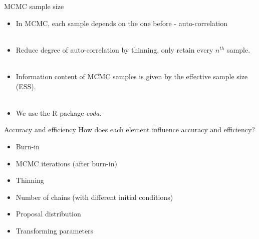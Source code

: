 \documentclass[compress]{beamer}
\begin{document}
\begin{frame}[label=sec-8-9]{MCMC sample size}
    \begin{itemize}
        \item In MCMC, each sample depends on the one before - \alert{auto-correlation} \\~\\
        \item Reduce degree of auto-correlation by \alert{thinning}, only retain every $n^{th}$ sample. \\~\\
        \item Information content of MCMC samples is given by the \alert{effective sample size (ESS)}. \\~\\
        \item We use the R package \textit{coda}.
    \end{itemize}
\end{frame}

\begin{frame}[label=sec-8-10]{Accuracy and efficiency}
  How does each element influence accuracy and efficiency?
  \begin{itemize}
    \item Burn-in
    \item MCMC iterations (after burn-in)
    \item Thinning
    \item Number of chains (with different initial conditions)
    \item Proposal distribution
    \item Transforming parameters
  \end{itemize}
\end{frame}
\end{document}
